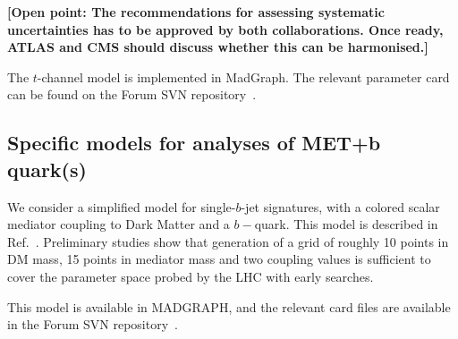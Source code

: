 \documentclass[a4,debug,notitlepage,nobib]{tufte-handout}
\newif\ifATLAS
\newif\ifCMS
\begin{document}
\textbf{[Open point: The recommendations for assessing systematic uncertainties has to be approved by 
both collaborations. Once ready, ATLAS and CMS should discuss whether this can be harmonised.]}

\ifATLAS 
The $s-$channel vector mediator model is included in this pilot 
MC15 request~\cite{ATLAS_PowhegPythiaMC15Test}, and instructions will be provided on a dedicated
twiki page. 
\fi

\ifCMS
\textbf{[Open point: Add here implementation details for CMS..]}
\fi


The $t$-channel model is implemented in MadGraph. 
The relevant parameter card can be found on the Forum
SVN repository~\cite{ForumSVN_TChannel}. 


\ifATLAS
\textbf{[Open point: Add here implementation details for ATLAS.]}
\fi

\ifCMS
\textbf{[Open point: Add here implementation details for CMS..]}
\fi

\subsection{Specific models for analyses of MET+b quark(s)}


We consider a simplified model for single-$b$-jet signatures, 
with a colored scalar mediator coupling to Dark Matter and a $b-$quark. 
This model is described in Ref.~\cite{Agrawal:2014una}. Preliminary studies 
show that generation of a grid of roughly 10 points in DM mass, 15 points in mediator
mass and two coupling values is sufficient to cover the parameter
space probed by the LHC with early searches. 

This model is available in MADGRAPH, and the relevant card files are 
available in the Forum SVN repository~\cite{ForumSVN_DMSingleB}.

\end{document}
